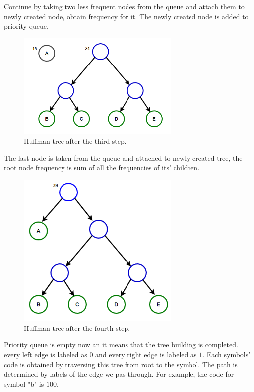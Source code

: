 Continue by taking two less frequent nodes from the queue and attach them to newly created node, obtain frequency for it. The newly created node is added to priority queue.

\begin{figure}[!ht]
    \centering
    \includegraphics[width=0.7\textwidth]{figure/huffman-3.png}
    \caption{Huffman tree after the third step.}
    \label{huffman-3}
\end{figure}

The last node is taken from the queue and attached to newly created tree, the root node frequency is sum of all the frequencies of its' children.

\begin{figure}[!ht]
    \centering
    \includegraphics[width=0.7\textwidth]{figure/huffman-4.png}
    \caption{Huffman tree after the fourth step.}
    \label{huffman-4}
\end{figure}

Priority queue is empty now an it means that the tree building is completed. every left edge is labeled as $0$ and every right edge is labeled as $1$. Each symbols' code is obtained by traversing this tree from root to the symbol. The path is determined by labels of the edge we pas through. For example, the code for symbol "b" is $100$.


